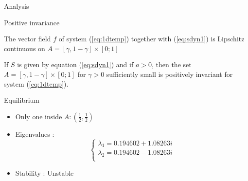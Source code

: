 \documentclass[10pt]{beamer}
\begin{document}
\begin{frame}{Analysis}

\begin{alertblock}{Positive invariance}
\begin{theorem}{}
The vector field $f$ of system (\ref{eq:1dtemp}) together with (\ref{eq:sdyn1}) is Lipschitz continuous on $A = [\gamma, 1-\gamma] \times [0;1]$
\end{theorem}

\begin{theorem}{}
\label{posinv}
If $S$ is given by equation (\ref{eq:sdyn1}) and if $a>0$, then the set $A = [\gamma, 1-\gamma] \times [0;1]$ for $\gamma > 0$ sufficiently small is positively invariant for system (\ref{eq:1dtemp}).
\end{theorem}
\end{alertblock}

\begin{exampleblock}{Equilibrium}
\begin{itemize}
\item Only one inside $A : (\frac{1}{2}, \frac{1}{2})$
\item Eigenvalues :
\[
\begin{cases}
\lambda_1 = 0.194602+1.08263i \\
\lambda_2 = 0.194602-1.08263i \\
\end{cases}
\]
\item Stability : Unstable
\end{itemize}
\end{exampleblock}

\end{frame}
\end{document}
